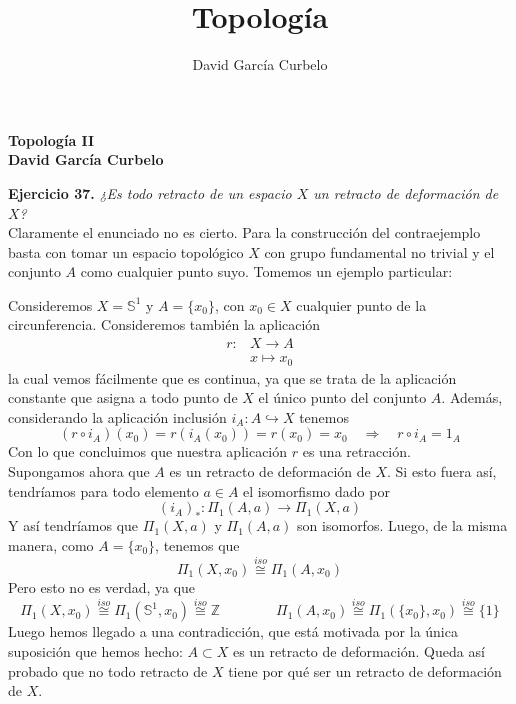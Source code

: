 \documentclass[fleqn]{article}
\author{David García Curbelo}
\title{Topología}
\def\Z{\mathds{Z}}
\def\next{\quad \Rightarrow \quad}
\begin{document}
    \setcounter{page}{1}
    \pagestyle{plain}

    \begin{center}
        {\large\bf{Topología II}} \\
        \bf{David García Curbelo}\\
        
    \end{center}

    \textbf{Ejercicio 37. } \textit{¿Es todo retracto de un espacio $X$ un retracto de deformación de $X$?}\\

    Claramente el enunciado no es cierto. Para la construcción del contraejemplo basta con tomar un espacio topológico $X$
    con grupo fundamental no trivial y el conjunto $A$ como cualquier punto suyo. Tomemos un ejemplo particular:

    Consideremos $X = \mathbb{S}^1$ y $A = \{x_0\}$, con $x_0 \in X$ cualquier punto de la circunferencia. Consideremos también
    la aplicación
    $$
    \begin{aligned}
        r : & X \longrightarrow A \\
            & x \longmapsto x_0
    \end{aligned}
    $$
    la cual vemos fácilmente que es continua, ya que se trata de la aplicación constante que asigna a todo punto de $X$ el 
    único punto del conjunto $A$. Además, considerando la aplicación inclusión $i_A : A \hookrightarrow X$ tenemos
    $$(r \circ i_A)(x_0) = r(i_A(x_0)) = r(x_0) = x_0 \next r \circ i_A = 1_A$$
    Con lo que concluimos que nuestra aplicación $r$ es una retracción.\\

    

    Supongamos ahora que $A$ es un retracto de deformación de $X$. Si esto fuera así, tendríamos para todo elemento $a \in A$ el isomorfismo
    dado por 
    $$(i_A)_* : \Pi_1 (A, a) \longrightarrow \Pi_1 (X, a)$$
    Y así tendríamos que $\Pi_1 (X, a)$ y $\Pi_1 (A, a)$ son isomorfos. Luego, de la misma manera, como $A = \{x_0\}$, tenemos que
    $$\Pi_1 (X, x_0) \overset{iso}{\cong} \Pi_1 (A, x_0)$$
    Pero esto no es verdad, ya que 
    $$\Pi_1 (X, x_0) \overset{iso}{\cong} \Pi_1 (\mathbb{S}^1, x_0) \overset{iso}{\cong} \Z \quad \quad \quad \quad 
    \Pi_1 (A, x_0) \overset{iso}{\cong} \Pi_1 (\{x_0\}, x_0) \overset{iso}{\cong} \{1\}$$
    Luego hemos llegado a una contradicción, que está motivada por la única suposición que hemos hecho: $A\subset X$ es un retracto de deformación.
    Queda así probado que no todo retracto de $X$ tiene por qué ser un retracto de deformación de $X$.

\end{document}

